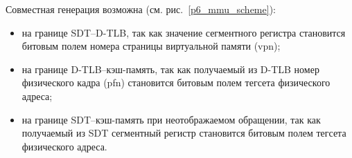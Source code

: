 Совместная генерация возможна (см. рис.~\ref{p6_mmu_scheme}):
\begin{itemize}
  \item на границе SDT--D-TLB, так как значение сегментного регистра
  становится битовым полем номера страницы виртуальной памяти (vpn);
  \item на границе D-TLB--кэш-память, так как получаемый из D-TLB номер
физического кадра (pfn) становится битовым полем тегсета физического
адреса;
  \item на границе SDT--кэш-память при неотображаемом обращении, так как
  получаемый из SDT сегментный регистр становится битовым полем тегсета физического
адреса.
\end{itemize}
